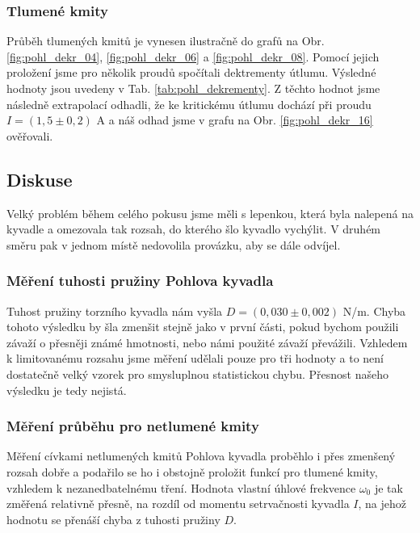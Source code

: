 \documentclass[english]{article}
\begin{document}
   	\subsubsection{Tlumené kmity}
		Průběh tlumených kmitů je vynesen ilustračně do grafů na Obr. \ref{fig:pohl_dekr_04}, \ref{fig:pohl_dekr_06} a \ref{fig:pohl_dekr_08}. Pomocí jejich proložení jsme pro několik proudů spočítali dektrementy útlumu. Výsledné hodnoty jsou uvedeny v Tab. \ref{tab:pohl_dekrementy}. Z těchto hodnot jsme následně extrapolací odhadli, že ke kritickému útlumu  dochází při proudu $I = (1,5\pm0,2)$ A a náš odhad jsme v grafu na Obr. \ref{fig:pohl_dekr_16} ověřovali. 
		
\subsection{Diskuse}
	Velký problém během celého pokusu jsme měli s lepenkou, která byla nalepená na kyvadle a omezovala tak rozsah, do kterého šlo kyvadlo vychýlit. V druhém směru pak v jednom místě nedovolila provázku, aby se dále odvíjel.
	\subsubsection{Měření tuhosti pružiny Pohlova kyvadla}
		Tuhost pružiny torzního kyvadla nám vyšla $D=(0,030\pm0,002)$ N/m. Chyba tohoto výsledku by šla zmenšit stejně jako v první části, pokud bychom použili závaží o přesněji známé hmotnosti, nebo námi použité závaží převážili. Vzhledem k limitovanému rozsahu jsme měření udělali pouze pro tři hodnoty a to není dostatečně velký vzorek pro smysluplnou statistickou chybu. Přesnost našeho výsledku je tedy nejistá.
	\subsubsection{Měření průběhu pro netlumené kmity}
		Měření cívkami netlumených kmitů Pohlova kyvadla proběhlo i přes zmenšený rozsah dobře a podařilo se ho i obstojně proložit funkcí pro tlumené kmity, vzhledem k nezanedbatelnému tření. Hodnota vlastní úhlové frekvence $\omega_0$ je tak změřená relativně přesně, na rozdíl od momentu setrvačnosti kyvadla $I$, na jehož hodnotu se přenáší chyba z tuhosti pružiny $D$.
\end{document}
